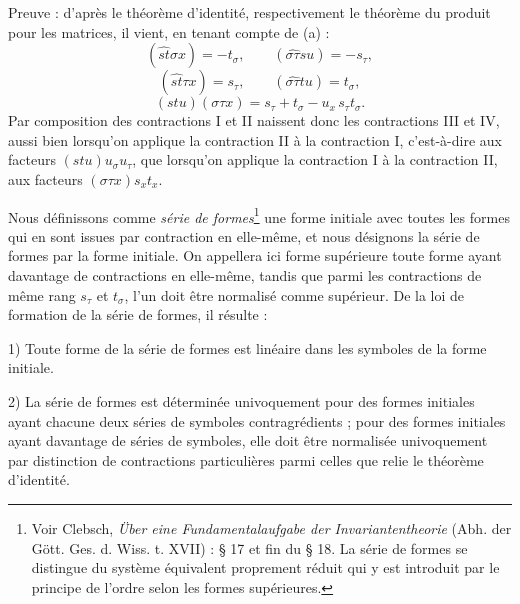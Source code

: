 \documentclass[11pt]{article}
\begin{document}
Preuve : d'après le théorème d'identité, respectivement le théorème du produit pour les matrices, il vient, en tenant compte de (a) :
\[
(\widehat{st}\sigma x)=-t_\sigma,\qquad
(\widehat{\sigma\tau}su)=-s_\tau,
\]
\[
(\widehat{st}\tau x)=s_\tau,\qquad
(\widehat{\sigma\tau}tu)=t_\sigma,
\]
\[
(stu)(\sigma\tau x)=s_\tau+t_\sigma-u_x\,s_\tau t_\sigma .
\]
Par composition des contractions I et II naissent donc les contractions III et IV, aussi bien lorsqu'on applique la contraction II à la contraction I, c'est-à-dire aux facteurs $(stu)u_\sigma u_\tau$, que lorsqu'on applique la contraction I à la contraction II, aux facteurs $(\sigma\tau x)s_xt_x$.

Nous définissons comme \emph{série de formes}\footnote{Voir Clebsch, \emph{Über eine Fundamentalaufgabe der Invariantentheorie} (Abh. der Gött. Ges. d. Wiss. t. XVII) : \S{} 17 et fin du \S{} 18. La \og{} série de formes \fg{} se distingue du \og{} système équivalent proprement réduit \fg{} qui y est introduit par le principe de l'ordre selon les formes supérieures.} une forme initiale avec toutes les formes qui en sont issues par contraction en elle-même, et nous désignons la série de formes par la forme initiale. On appellera ici \og{} forme supérieure \fg{} toute forme ayant davantage de contractions en elle-même, tandis que parmi les contractions de même rang $s_\tau$ et $t_\sigma$, l'un doit être normalisé comme supérieur. De la loi de formation de la série de formes, il résulte :

1) Toute forme de la série de formes est linéaire dans les symboles de la forme initiale.

2) La série de formes est déterminée univoquement pour des formes initiales ayant chacune deux séries de symboles contragrédients ; pour des formes initiales ayant davantage de séries de symboles, elle doit être normalisée univoquement par distinction de contractions particulières parmi celles que relie le théorème d'identité.
\end{document}
